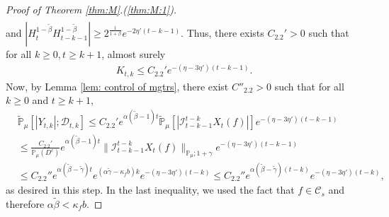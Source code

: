 \documentclass[12pt,a4paper]{amsart}
\theoremstyle{plain}
\theoremstyle{definition}
\numberwithin{equation}{section}
\begin{document}
\begin{proof}[Proof of Theorem \ref{thm:M}.(\ref{thm:M:1})]
\begin{align}
  \end{align}
  and $ |H_t^{1 - \tilde \beta} H_{t-k-1}^{ 1 - \tilde \beta}| \geq 2^{\frac{1}{1+\beta}} e^{-2\eta'(t-k-1)}$.
  Thus, there exists $C_{2.2}'> 0$ such that for all $k \geq 0, t\geq k+1$, almost surely
  \begin{align}
    K_{t,k}
    \leq C_{2.2}' e^{-(\eta - 3\eta')(t-k-1)}.
  \end{align}
  Now, by Lemma \ref{lem: control of mgtrs}, there exist $C''_{2.2}>0$ such that for all $k\geq 0$ and $t\geq k+1$,
  \begin{align}
    \label{eq: Y in D}
    & \mathbb{\widetilde{P}}_{\mu} [|Y_{t,k}| ; \mathcal{D}_{t,k} ]
    \leq C_{2.2}' e^{\alpha (\tilde \beta - 1)t} \mathbb{\widetilde{P}}_{\mu} [ | \mathcal{I}_{t-k-1}^{t-k}X_t(f)| ] e^{-(\eta - 3\eta')(t-k-1)} \\
    & \leq \frac{C_{2.2}' } {\mathbb{P}_{\mu}(D^c)} e^{ \alpha (\tilde \beta - 1)t} \|\mathcal{I}_{t-k-1}^{t-k} X_t(f)\|_{\mathbb P_\mu; 1+\gamma} e^{-(\eta - 3\eta')(t-k - 1)} \\
    & \leq C_{2.2}'' e^{\alpha(\tilde \beta - \tilde \gamma)t} e^{ (\alpha \tilde \gamma - \kappa_f b)k} e^{-(\eta - 3\eta')(t-k)}
     \leq C_{2.2}'' e^{\alpha(\tilde \beta - \tilde \gamma)(t-k)} e^{-(\eta - 3\eta')(t-k)},
  \end{align}
  as desired in this step.
  In the last inequality, we used the fact that $f\in \mathcal C_s$ and therefore $\alpha \tilde \beta < \kappa_f b$.


\end{proof}
\end{document}
